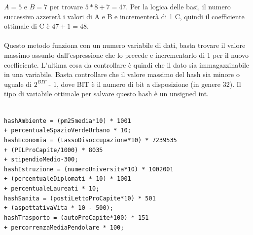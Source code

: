 \documentclass[a4paper,12pt]{report}
\begin{document}
            $A = 5$ e $B = 7$ per trovare $5 * 8 + 7 = 47$. Per la logica delle basi, il numero successivo azzererà i valori di 
            A e B e incrementerà di 1 C, quindi il coefficiente ottimale di C è $47 + 1 = 48$. \\
            \\
            Questo metodo funziona con un 
            numero variabile di dati, basta trovare il valore massimo assunto dall'espressione che lo precede e incrementarlo 
            di 1 per il nuovo coefficiente. L'ultima cosa da controllare è quindi che il dato sia immagazzinabile in una 
            variabile. Basta controllare che il valore massimo del hash sia minore o uguale di $2^{BIT}$ - 1, dove BIT è il numero 
            di bit a disposizione (in genere 32). Il tipo di variabile ottimale per salvare questo hash è un unsigned int.
            

            \noindent
            \texttt{
                \noindent
                \\
                hashAmbiente = (pm25media*10) * 1001\\ 
                \null\qquad\qquad + percentualeSpazioVerdeUrbano * 10;\\
                hashEconomia = (tassoDisoccupazione*10) * 7239535 \\
                \null\qquad\qquad + (PILProCapite/1000) * 8035 \\
                \null\qquad\qquad + stipendioMedio-300;\\
                hashIstruzione = (numeroUniversita*10) * 1002001 \\
                \null\qquad\qquad + (percentualeDiplomati * 10) * 1001\\
                \null\qquad\qquad +  percentualeLaureati * 10;\\
                hashSanita = (postiLettoProCapite*10) * 501 \\
                \null\qquad\qquad + (aspettativaVita * 10 - 500);\\
                hashTrasporto = (autoProCapite*100) * 151 \\
                \null\qquad\qquad + percorrenzaMediaPendolare * 100;\\
            }

 
            
\end{document}
